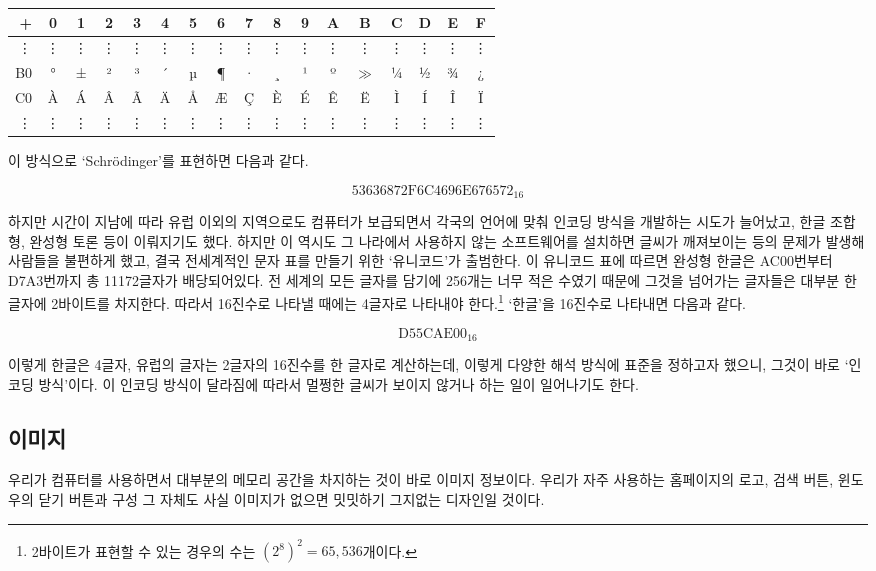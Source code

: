 \documentclass{article}
\begin{document}
\begin{center}
    \begin{tabular}{r|cccccccccccccccc}
        + & 0 & 1 & 2 & 3 & 4 & 5 & 6 & 7 & 8 & 9 & A & B & C & D & E & F \\
        \hline
        \vdots & \vdots & \vdots & \vdots & \vdots & \vdots & \vdots & \vdots & \vdots & \vdots & \vdots & \vdots & \vdots & \vdots & \vdots & \vdots & \vdots \\
        B0 & ° & ± & ² & ³ & ´ & µ & ¶ & · & ¸ & ¹ & º & $\gg$ & ¼ & ½ & ¾ & ¿ \\
        C0 & À & Á & Â & Ã & Ä & Å & Æ & Ç & È & É & Ê & Ë & Ì & Í & Î & Ï \\
        \vdots & \vdots & \vdots & \vdots & \vdots & \vdots & \vdots & \vdots & \vdots & \vdots & \vdots & \vdots & \vdots & \vdots & \vdots & \vdots & \vdots
    \end{tabular}
\end{center}

이 방식으로 `Schrödinger'를 표현하면 다음과 같다.

$$
\text{53636872F6C4696E676572}_{16}
$$

하지만 시간이 지남에 따라 유럽 이외의 지역으로도 컴퓨터가 보급되면서 각국의 언어에 맞춰 인코딩
방식을 개발하는 시도가 늘어났고, 한글 조합형, 완성형 토론 등이 이뤄지기도 했다.
하지만 이 역시도 그 나라에서 사용하지 않는 소프트웨어를 설치하면 글씨가 깨져보이는 등의 문제가
발생해 사람들을 불편하게 했고, 결국 전세계적인 문자 표를 만들기 위한 `유니코드'가 출범한다.
이 유니코드 표에 따르면 완성형 한글은 AC00번부터 D7A3번까지 총 11172글자가 배당되어있다.
전 세계의 모든 글자를 담기에 256개는 너무 적은 수였기 때문에 그것을 넘어가는 글자들은 대부분
한 글자에 2바이트를 차지한다. 따라서 16진수로 나타낼 때에는 4글자로 나타내야
한다.\footnote{2바이트가 표현할 수 있는 경우의 수는 $(2^8)^2 = 65,536$개이다.}
`한글'을 16진수로 나타내면 다음과 같다.

$$
\text{D55CAE00}_{16}
$$

이렇게 한글은 4글자, 유럽의 글자는 2글자의 16진수를 한 글자로 계산하는데, 이렇게 다양한
해석 방식에 표준을 정하고자 했으니, 그것이 바로 `인코딩 방식'이다. 이 인코딩 방식이 달라짐에
따라서 멀쩡한 글씨가 보이지 않거나 하는 일이 일어나기도 한다.

\subsection{이미지}

우리가 컴퓨터를 사용하면서 대부분의 메모리 공간을 차지하는 것이 바로 이미지 정보이다.
우리가 자주 사용하는 홈페이지의 로고, 검색 버튼, 윈도우의 닫기 버튼과 구성 그 자체도
사실 이미지가 없으면 밋밋하기 그지없는 디자인일 것이다.
\end{document}
